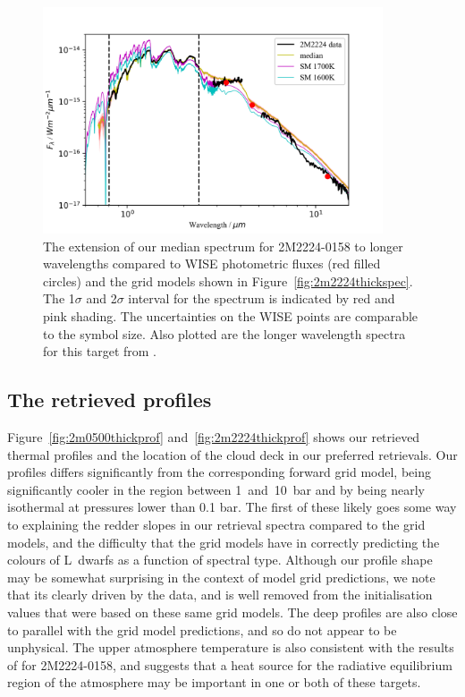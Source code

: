 \documentclass[useAMS,usenatbib]{mn2e}
\begin{document}
\begin{figure}
\hspace{-0.8cm}\includegraphics[width=285pt]{2M2224_spag_EXT_ucl.png}
\caption{The extension of our median spectrum for 2M2224-0158 to longer wavelengths compared to WISE photometric fluxes (red filled circles) and the grid models shown in Figure~\ref{fig:2m2224thickspec}. The 1$\sigma$ and 2$\sigma$ interval for the spectrum is indicated by red and pink shading. The uncertainties on the WISE points are comparable to the symbol size.  Also plotted are the longer wavelength spectra for this target from \citet{cushing2006}.
\label{fig:longspec2}}
\end{figure}

\subsection{The retrieved profiles}
\label{sec:prof}

Figure~\ref{fig:2m0500thickprof} and~\ref{fig:2m2224thickprof} shows our retrieved thermal profiles and the location of the cloud deck in our preferred retrievals. Our profiles differs significantly from the corresponding forward grid model, being significantly cooler in the region between 1~and~10~bar and by being nearly isothermal at pressures lower than 0.1 bar. The first of these likely goes some way to explaining the redder slopes in our retrieval spectra compared to the grid models, and the difficulty that the grid models have in correctly predicting the colours of L~dwarfs as a function of spectral type. Although our profile shape may be somewhat surprising in the context of model grid predictions, we note that its clearly driven by the data, and is well removed from the initialisation values that were based on these same grid models. The deep profiles are also close to parallel with the grid model predictions, and so do not appear to be unphysical. The upper atmosphere temperature is also consistent with the results of \citet{sorahana2014} for 2M2224-0158, and suggests that a heat source for the radiative equilibrium region of the atmosphere may be important in one or both of these targets. 
\end{document}
